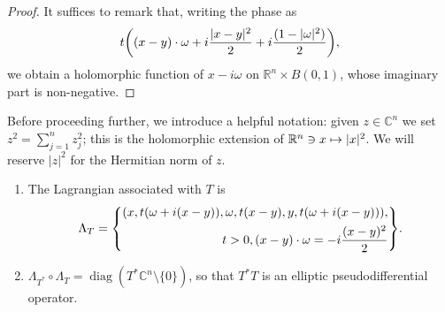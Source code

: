 \documentclass[AHL,Unicode,longabstracts,published]{cedram}
\DeclareMathOperator{\diag}{diag}
\newcommand\1{\mathds{1}}
\newcommand{\R}{\mathbb{R}}
\newcommand{\C}{\mathbb{C}}
\let\oldmapsto\mapsto
\renewcommand*{\mapsto}{\mathchoice{\longmapsto}{\oldmapsto}{\oldmapsto}{\oldmapsto}}
\let\originalleft\left
\let\originalright\right
\renewcommand{\left}{\mathopen{}\mathclose\bgroup\originalleft}
\renewcommand{\right}{\aftergroup\egroup\originalright}
\begin{document}
\begin{proof}
It suffices to remark that, writing the phase as
\[
t\left((x-y)\cdot \omega+i\frac{|x-y|^2}{2}+i\frac{(1-|\omega|^2)}{2}\right),
\]
we obtain a holomorphic function of $x-i\omega$ on $\R^n\times B(0,1)$, whose imaginary part is non-negative.
\end{proof}

Before proceeding further, we introduce a helpful notation: given $z\in \C^n$ we set $z^2=\sum_{j=1}^nz_j^2$; this is the holomorphic extension of $\R^n\ni x\mapsto |x|^2$. We will reserve $|z|^2$ for the Hermitian norm of $z$.

\begin{prop}\leavevmode
\label{prop:T*T}
\begin{enumerate}
\item\label{prop4.19.1} The Lagrangian associated with $T$ is
\[
\Lambda_T=
\left\{
\begin{aligned}
(x,t(\omega+i(x-y)),\omega,t(x-y),y,t(\omega+i(x-y))),\\
t>0,(x-y)\cdot \omega=-i\frac{(x-y)^2}{2}
\end{aligned}
\right\}.
\]
\item\label{prop4.19.2} $\Lambda_{T^*}\circ
\Lambda_T=\diag(T^*\C^n\setminus \{0\})$, so that $T^*T$ is an elliptic pseudodifferential operator.


\end{enumerate}
\end{prop}
\end{document}
